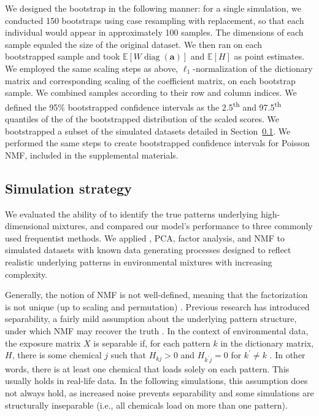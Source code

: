 We designed the bootstrap in the following manner: for a single simulation, we conducted 150 bootstraps using case resampling with replacement, so that each individual would appear in approximately 100 samples. The dimensions of each sample equaled the size of the original dataset. We then ran \bnmf on each bootstrapped sample and took $\mathbb{E}\left[W\operatorname{diag}(\mathbf{a})\right]$ and $\mathbb{E}\left[H\right]$ as point estimates. We employed the same scaling steps as above, $\ell_1$-normalization of the dictionary matrix and corresponding scaling of the coefficient matrix, on each bootstrap sample. We combined samples according to their row and column indices. We defined the 95\% bootstrapped confidence intervals as the 2.5\textsuperscript{th} and 97.5\textsuperscript{th} quantiles of the of the bootstrapped distribution of the scaled scores. We bootstrapped a subset of the simulated datasets detailed in Section~\ref{methods_sim}. We performed the same steps to create bootstrapped confidence intervals for Poisson NMF, included in the supplemental materials.

\subsection{Simulation strategy}
\label{methods_sim}
We evaluated the ability of \bnmf to identify the true patterns underlying high-dimensional mixtures, and compared our model's performance to three commonly used frequentist methods. We applied \bnmfc, PCA, factor analysis, and NMF to simulated datasets with known data generating processes designed to reflect realistic underlying patterns in environmental mixtures with increasing complexity.

Generally, the notion of NMF is not well-defined, meaning that the factorization is not unique (up to scaling and permutation) \citep{laurberg2008theorems}. Previous research has introduced separability, a fairly mild assumption about the underlying pattern structure, under which NMF may recover the truth \citep{donoho2004does}. In the context of environmental data, the exposure matrix $X$ is separable if, for each pattern $k$ in the dictionary matrix, $H$, there is some chemical $j$ such that $H_{k j} > 0$ and $H_{k^{\prime} j}=0$ for $k^{\prime} \neq k$ \citep{arora2012learning}. In other words, there is at least one chemical that loads solely on each pattern. This usually holds in real-life data. In the following simulations, this assumption does not always hold, as increased noise prevents separability and some simulations are structurally inseparable (i.e., all chemicals load on more than one pattern). 

